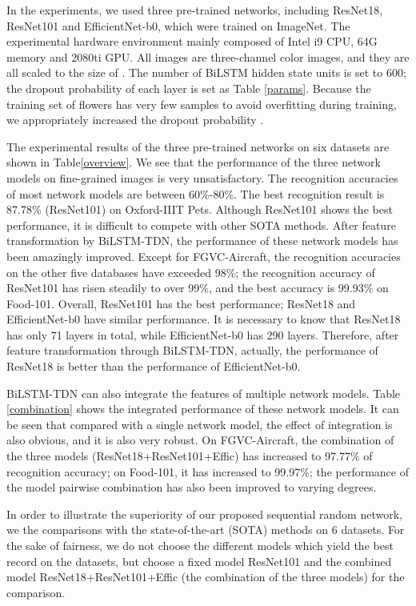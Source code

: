 \documentclass[10pt,twocolumn,letterpaper]{article}
\begin{document}
In the experiments, we used three pre-trained networks, including ResNet18, ResNet101 and EfficientNet-b0, which were trained on ImageNet. The experimental hardware environment mainly composed of Intel i9 CPU, 64G memory and 2080ti GPU. All images are three-channel color images, and they are all scaled to the size of . The number of BiLSTM hidden state units is set to 600; the dropout probability of each layer is set as Table \ref{params}. Because the training set of flowers has very few samples to avoid overfitting during training, we appropriately increased the dropout probability .

The experimental results of the three pre-trained networks on six datasets are shown in Table\ref{overview}. We see that the performance of the three network models on fine-grained images is very unsatisfactory. The recognition accuracies of most network models are between 60\%-80\%. The best recognition result is 87.78\% (ResNet101) on Oxford-IIIT Pets. Although ResNet101 shows the best performance, it is difficult to compete with other SOTA methods. After feature transformation by BiLSTM-TDN, the performance of these network models has been amazingly improved. Except for FGVC-Aircraft, the recognition accuracies on the other five databases have exceeded 98\%; the recognition accuracy of ResNet101 has risen steadily to over 99\%, and the best accuracy is 99.93\% on Food-101.	Overall, ResNet101 has the best performance; ResNet18 and EfficientNet-b0 have similar performance. It is necessary to know that ResNet18 has only 71 layers in total, while EfficientNet-b0 has 290 layers. Therefore, after feature transformation through BiLSTM-TDN, actually, the performance of ResNet18 is better than the performance of EfficientNet-b0.	

BiLSTM-TDN can also integrate the features of multiple network models. Table \ref{combination} shows the integrated performance of these network models. It can be seen that compared with a single network model, the effect of integration is also obvious, and it is also very robust. On FGVC-Aircraft, the combination of the three models (ResNet18+ResNet101+Effic) has increased to 97.77\% of recognition accuracy; on Food-101, it has increased to 99.97\%; the performance of the model pairwise combination has also been improved to varying degrees.	

In order to illustrate the superiority of our proposed sequential random network, we the comparisons with the state-of-the-art (SOTA) methods on 6 datasets. For the sake of fairness, we do not choose the different models which yield the best record on the datasets, but choose a fixed model ResNet101 and the combined model ResNet18+ResNet101+Effic (the combination of the three models) for the comparison. 
\end{document}
